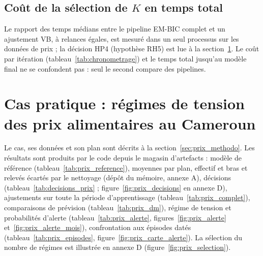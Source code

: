 \subsection{Coût de la sélection de $K$ en temps total}\label{sec:res_cout}
Le rapport des temps médians entre le pipeline EM-BIC complet et un ajustement VB, à relances égales, est mesuré dans un seul processus sur les données de prix ; la décision HP4 (hypothèse RH5) est lue à la section~\ref{sec:res_prix}. Le coût par itération (tableau~\ref{tab:chronometrage}) et le temps total jusqu'au modèle final ne se confondent pas : seul le second compare des pipelines.

\section{Cas pratique : régimes de tension des prix alimentaires au Cameroun}\label{sec:res_prix}
Le cas, ses données et son plan sont décrits à la section~\ref{sec:prix_methodo}. Les résultats sont produits par le code depuis le magasin d'artefacts : modèle de référence (tableau~\ref{tab:prix_reference}), moyennes par plan, effectif et bras et relevés écartés par le nettoyage (dépôt du mémoire, annexe A), décisions (tableau~\ref{tab:decisions_prix} ; figure~\ref{fig:prix_decisions} en annexe D), ajustements sur toute la période d'apprentissage (tableau~\ref{tab:prix_complet}), comparaisons de prévision (tableau~\ref{tab:prix_dm}), régime de tension et probabilités d'alerte (tableau~\ref{tab:prix_alerte}, figures~\ref{fig:prix_alerte} et~\ref{fig:prix_alerte_mois}), confrontation aux épisodes datés (tableau~\ref{tab:prix_episodes}, figure~\ref{fig:prix_carte_alerte}). La sélection du nombre de régimes est illustrée en annexe D (figure~\ref{fig:prix_selection}).


